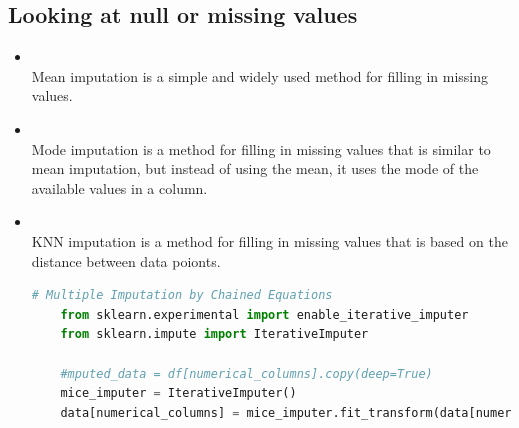 \documentclass{article}
\begin{document}
\subsection{Looking at null or missing values}
\begin{itemize}
    \item \textbf{\textcolor{blue}{}}\\
    Mean imputation is a simple and widely used method for filling in missing values. 
    \item \textbf{\textcolor{blue}{}}\\
    Mode imputation is a method for filling in missing values that is similar to mean imputation, but instead of using the mean, it uses the mode of the available values in a column.
    \item \textbf{\textcolor{blue}{}}\\
    KNN imputation is a method for filling in missing values that is based on the distance between data poionts.
    \begin{center}
    \begin{lstlisting}[language=Python, caption={Logistic Regression Example}, label={lst:logreg}, backgroundcolor=\color{gray!10}, frame=single, keywordstyle=\color{blue}\bfseries, commentstyle=\color{green!50!black}, stringstyle=\color{orange}]
    # Multiple Imputation by Chained Equations
    from sklearn.experimental import enable_iterative_imputer
    from sklearn.impute import IterativeImputer

    #mputed_data = df[numerical_columns].copy(deep=True) 
    mice_imputer = IterativeImputer()
    data[numerical_columns] = mice_imputer.fit_transform(data[numerical_columns])
    \end{lstlisting}
    \end{center}
\end{itemize}
\end{document}
